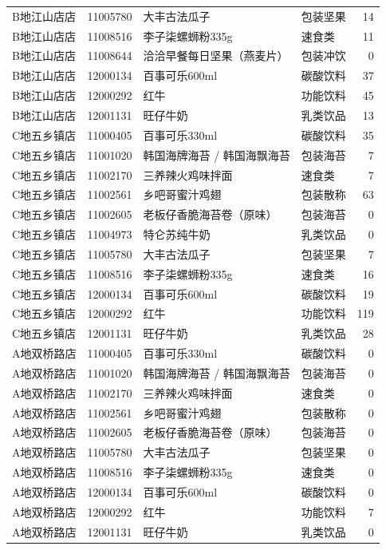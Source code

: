 \begin{longtable}{p{2.4cm}p{1.9cm}p{4.4cm}p{1.8cm}r}
B地江山店店 & 11005780 & 大丰古法瓜子 & 包装坚果 & 14 \\
B地江山店店 & 11008516 & 李子柒螺蛳粉335g & 速食类 & 11 \\
B地江山店店 & 11008644 & 洽洽早餐每日坚果（燕麦片） & 包装冲饮 & 0 \\
B地江山店店 & 12000134 & 百事可乐600ml & 碳酸饮料 & 37 \\
B地江山店店 & 12000292 & 红牛 & 功能饮料 & 45 \\
B地江山店店 & 12001131 & 旺仔牛奶 & 乳类饮品 & 13 \\
C地五乡镇店 & 11000405 & 百事可乐330ml & 碳酸饮料 & 35 \\
C地五乡镇店 & 11001020 & 韩国海牌海苔 / 韩国海飘海苔 & 包装海苔 & 7 \\
C地五乡镇店 & 11002170 & 三养辣火鸡味拌面 & 速食类 & 7 \\
C地五乡镇店 & 11002561 & 乡吧哥蜜汁鸡翅 & 包装散称 & 63 \\
C地五乡镇店 & 11002605 & 老板仔香脆海苔卷（原味） & 包装海苔 & 0 \\
C地五乡镇店 & 11004973 & 特仑苏纯牛奶 & 乳类饮品 & 0 \\
C地五乡镇店 & 11005780 & 大丰古法瓜子 & 包装坚果 & 7 \\
C地五乡镇店 & 11008516 & 李子柒螺蛳粉335g & 速食类 & 16 \\
C地五乡镇店 & 12000134 & 百事可乐600ml & 碳酸饮料 & 19 \\
C地五乡镇店 & 12000292 & 红牛 & 功能饮料 & 119 \\
C地五乡镇店 & 12001131 & 旺仔牛奶 & 乳类饮品 & 28 \\
A地双桥路店 & 11000405 & 百事可乐330ml & 碳酸饮料 & 0 \\
A地双桥路店 & 11001020 & 韩国海牌海苔 / 韩国海飘海苔 & 包装海苔 & 0 \\
A地双桥路店 & 11002170 & 三养辣火鸡味拌面 & 速食类 & 0 \\
A地双桥路店 & 11002561 & 乡吧哥蜜汁鸡翅 & 包装散称 & 0 \\
A地双桥路店 & 11002605 & 老板仔香脆海苔卷（原味） & 包装海苔 & 0 \\
A地双桥路店 & 11005780 & 大丰古法瓜子 & 包装坚果 & 0 \\
A地双桥路店 & 11008516 & 李子柒螺蛳粉335g & 速食类 & 0 \\
A地双桥路店 & 12000134 & 百事可乐600ml & 碳酸饮料 & 0 \\
A地双桥路店 & 12000292 & 红牛 & 功能饮料 & 7 \\
A地双桥路店 & 12001131 & 旺仔牛奶 & 乳类饮品 & 0 \\
\bottomrule
\end{longtable}
\endgroup

